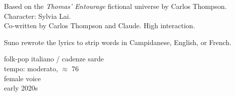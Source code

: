 
\label{sec:peccato-daprile}

\begin{notes}
Based on the \emph{Thomas’ Entourage} fictional universe by Carlos Thompson.\\
Character: Sylvia Lai.\\
Co-written by Carlos Thompson and Claude. %
High interaction.

Suno rewrote the lyrics to strip words in Campidanese, English, or French.
\end{notes}

\begin{style}
folk-pop italiano / cadenze sarde\\
tempo: moderato, \quarternote\(\approx\) 76\\
female voice\\
early 2020s
\end{style}

